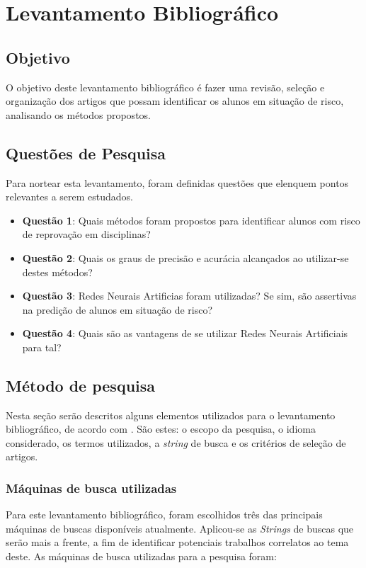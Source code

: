 \documentclass[
	12pt,				%
	openright,			%
	oneside,
	a4paper,			%
	english,			%
	french,				%
	spanish,			%
	brazil,				%
	]{abntex2}
\begin{document}
\section{Levantamento Bibliográfico}
\label{sec:Lev}
\subsection{Objetivo}
\label{sec:Obj}
O objetivo deste levantamento bibliográfico é fazer uma revisão, seleção e organização dos artigos que possam identificar os alunos em situação de risco, analisando os métodos propostos.

\subsection{Questões de Pesquisa}
\label{sec:QP}
Para nortear esta levantamento, foram definidas questões que elenquem pontos relevantes a serem estudados.
\begin{itemize}
    \item \textbf{Questão 1}: Quais métodos foram propostos para identificar alunos com risco de reprovação em disciplinas?
    \item \textbf{Questão 2}: Quais os graus de precisão e acurácia alcançados ao utilizar-se destes métodos?
    \item \textbf{Questão 3}: Redes Neurais Artificias foram utilizadas? Se sim, são assertivas na predição de alunos em situação de risco?
    \item \textbf{Questão 4}: Quais são as vantagens de se utilizar Redes Neurais Artificiais para tal?
\end{itemize}

\subsection{Método de pesquisa} \label{sec:MP}
Nesta seção serão descritos alguns elementos utilizados para o levantamento bibliográfico, de acordo com . São estes: o escopo da pesquisa, o idioma considerado, os termos utilizados, a \textit{string} de busca e os critérios de seleção de artigos.


\subsubsection{Máquinas de busca utilizadas}
Para este levantamento bibliográfico, foram escolhidos três das principais máquinas de buscas disponíveis atualmente. Aplicou-se as \textit{Strings} de buscas que serão mais a frente, a fim de identificar potenciais trabalhos correlatos ao tema deste. As máquinas de busca utilizadas para a pesquisa foram:
\end{document}
